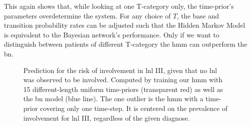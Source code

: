 \documentclass[\relativeRoot/main.tex]{subfiles}
\begin{document}
This again shows that, while looking at one T-category only, the time-prior's parameters overdetermine the system. For any choice of $T$, the base and transition probability rates can be adjusted such that the Hidden Markov Model is equivalent to the Bayesian network's performance. Only if we want to distinguish between patients of different T-category the \gls{hmm} can outperform the \gls{bn}.

\begin{figure}
    \centering
    \def\svgwidth{0.7\textwidth}
    
    \caption{Prediction for the risk of involvement in \gls{lnl} III, given that no \gls{lnl} was observed to be involved. Computed by training our \gls{hmm} with 15 different-length uniform time-priors (transparent red) as well as the \gls{bn} model (blue line). The one outlier is the \gls{hmm} with a time-prior covering only one time-step. It is centered on the prevalence of involvement for \gls{lnl} III, regardless of the given diagnose.}
    \label{fig:unilateral:tprior:multi_length_risk}
\end{figure}
\end{document}
